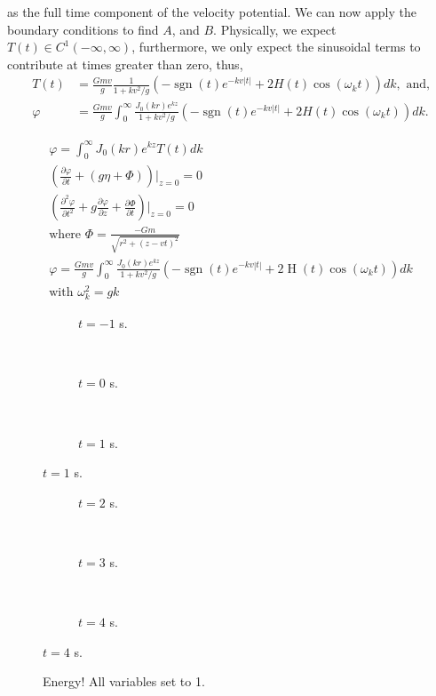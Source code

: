 \documentclass[12pt]{article}
\DeclareMathOperator{\sgn}{sgn}
\DeclareMathOperator{\Heavi}{H}
\begin{document}
as the full time component of the velocity potential. We can now apply the boundary conditions to find $A$, and $B$. Physically, we expect $T(t) \in C^1(-\infty,\infty)$, furthermore, we only expect the sinusoidal terms to contribute at times greater than zero, thus,
\begin{align*}
T(t) &= \frac{Gmv}{g}\frac{1}{1+kv^2/g} \left(-\sgn(t)e^{-kv|t|} + 2H(t)\cos(\omega_k t) \right)dk, \text{ and,} \\
\varphi &= \frac{Gmv}{g} \int_0^\infty \frac{J_0(kr)e^{kz}}{1+kv^2/g} \left(-\sgn(t)e^{-kv|t|} + 2H(t)\cos(\omega_k t) \right)dk.
\end{align*}

\begin{align*}
\varphi = \int_0^\infty J_0(kr) e^{kz} T(t) dk \\
\left( \frac{\partial \varphi}{\partial t} + (g \eta + \Phi) \right) \bigg|_{z=0} = 0 \\
\left( \frac{\partial^2 \varphi}{\partial t^2} + g \frac{\partial \varphi}{\partial z} + \frac{\partial \Phi}{\partial t} \right) \bigg|_{z=0} = 0\\
\text{where }\Phi = \frac{-Gm}{\sqrt{r^2+(z-vt)^2}} \\
\varphi = \frac{Gmv}{g} \int_0^\infty \frac{J_0(kr)e^{kz}}{1+kv^2/g} \left(-\sgn(t)e^{-kv|t|} + 2 \Heavi (t)\cos(\omega_k t) \right)dk \\
\text{with } \omega_k^2=gk
\end{align*}

\newpage

\begin{figure}[p]
\begin{centering}
 \begin{subfigure}{\textwidth}
  
  \caption{$t=-1$ s.}
 \end{subfigure} \\
 \begin{subfigure}{\textwidth}
  
  \caption{$t=0$ s.}
 \end{subfigure} \\
 \begin{subfigure}{\textwidth}
  
  \caption{$t=1$ s.}
 \end{subfigure}
\end{centering}
\end{figure}

\begin{figure}[p] \ContinuedFloat
\begin{centering}
 \begin{subfigure}{\textwidth}
  
  \caption{$t=2$ s.}
 \end{subfigure} \\
 \begin{subfigure}{\textwidth}
  
  \caption{$t=3$ s.}
 \end{subfigure} \\
  \begin{subfigure}{\textwidth}
  
  \caption{$t=4$ s.}
 \end{subfigure}
 \end{centering}
\end{figure}


\begin{figure}[p]
 
 \caption{Energy! All variables set to 1.}
\end{figure}
\end{document}
